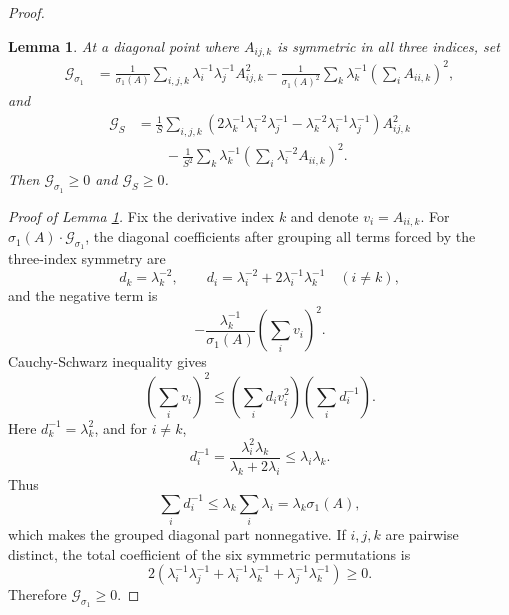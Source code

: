 \documentclass[11pt]{amsart}
\numberwithin{equation} {section}
\numberwithin{equation}{section}
\newtheorem{lemma}[theorem]{\bf Lemma}
\begin{document}
\begin{proof}
\begin{lemma}\label{third forms}
At a diagonal point where $A_{ij,k}$ is symmetric in all three indices, set
\[
\begin{split}
        \mathcal G_{\sigma_1}
        &=\frac{1}{\sigma_1(A)}
        \sum_{i,j,k}\lambda_i^{-1}\lambda_j^{-1}A_{ij,k}^2
        -\frac{1}{\sigma_1(A)^2}
        \sum_k\lambda_k^{-1}\left(\sum_iA_{ii,k}\right)^2,
\end{split}
\]
and
\[
\begin{split}
        \mathcal G_S
        &=\frac{1}{S}
        \sum_{i,j,k}
        \left(2\lambda_k^{-1}\lambda_i^{-2}\lambda_j^{-1}
        -\lambda_k^{-2}\lambda_i^{-1}\lambda_j^{-1}\right)A_{ij,k}^2\\
        &\qquad
        -\frac{1}{S^2}
        \sum_k\lambda_k^{-1}
        \left(\sum_i\lambda_i^{-2}A_{ii,k}\right)^2.
\end{split}
\]
Then $\mathcal G_{\sigma_1}\geq0$ and $\mathcal G_S\geq0$.
\end{lemma}

\noindent\emph{Proof of Lemma \ref{third forms}.}
Fix the derivative index $k$ and denote $v_i=A_{ii,k}$. For
$\sigma_1(A)\cdot\mathcal G_{\sigma_1}$, the diagonal coefficients after grouping all terms
forced by the three-index symmetry are
\[
        d_k=\lambda_k^{-2},\qquad
        d_i=\lambda_i^{-2}+2\lambda_i^{-1}\lambda_k^{-1}\quad (i\ne k),
\]
and the negative term is
\[
        -\frac{\lambda_k^{-1}}{\sigma_1(A)}
        \left(\sum_i v_i\right)^2.
\]
Cauchy-Schwarz inequality gives
\[
        \left(\sum_i v_i\right)^2
        \leq \left(\sum_i d_i v_i^2\right)\left(\sum_i d_i^{-1}\right).
\]
Here $d_k^{-1}=\lambda_k^2$, and for $i\ne k$,
\[
        d_i^{-1}
        =\frac{\lambda_i^2\lambda_k}{\lambda_k+2\lambda_i}
        \leq \lambda_i\lambda_k.
\]
Thus
\[
        \sum_i d_i^{-1}\leq \lambda_k\sum_i\lambda_i
        =\lambda_k\sigma_1(A),
\]
which makes the grouped diagonal part nonnegative. If $i,j,k$ are pairwise
distinct, the total coefficient of the six symmetric permutations is
\[
        2(\lambda_i^{-1}\lambda_j^{-1}
        +\lambda_i^{-1}\lambda_k^{-1}
        +\lambda_j^{-1}\lambda_k^{-1})\geq0.
\]
Therefore $\mathcal G_{\sigma_1}\geq0$.


\end{proof}
\end{document}
